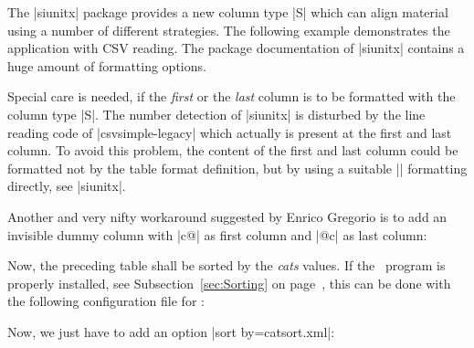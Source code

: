 \documentclass[a4paper,11pt]{ltxdoc}
\begin{document}

The |siunitx| package provides a new column type |S|
which can align material using a number of different strategies.
The following example demonstrates the application with CSV reading.
The package documentation of |siunitx| contains a huge amount
of formatting options.

\begin{dispExample}
\end{dispExample}

\clearpage
Special care is needed, if the \emph{first} or the \emph{last} column is to be formatted with
the column type |S|. The number detection of |siunitx| is disturbed by
the line reading code of |csvsimple-legacy| which actually is present at the
first and last column. To avoid this problem, the content of the first and last column
could be formatted not by the table format definition, but by using a
suitable |\tablenum| formatting directly, see |siunitx|.

Another and very nifty workaround suggested by Enrico Gregorio is to
add an invisible dummy column with |c@{}| as first column
and |@{}c| as last column:


\begin{dispExample}
\end{dispExample}


\clearpage
Now, the preceding table shall be sorted by the \emph{cats} values.
If the \csvsorter\ program is properly installed,
see Subsection~\ref{sec:Sorting} on page~\pageref{sec:Sorting},
this can be done with the following configuration file for \csvsorter:


Now, we just have to add an option |sort by=catsort.xml|:
\begin{dispExample}
\end{dispExample}
\end{document}
